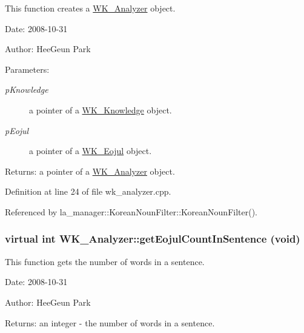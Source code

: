 This function creates a \hyperlink{classWK__Analyzer}{WK\_\-Analyzer} object. 

\begin{Desc}
\item[Date:]2008-10-31 \end{Desc}
\begin{Desc}
\item[Author:]HeeGeun Park \end{Desc}
\begin{Desc}
\item[Parameters:]
\begin{description}
\item[{\em pKnowledge}]a pointer of a \hyperlink{classWK__Knowledge}{WK\_\-Knowledge} object. \item[{\em pEojul}]a pointer of a \hyperlink{classWK__Eojul}{WK\_\-Eojul} object. \end{description}
\end{Desc}
\begin{Desc}
\item[Returns:]a pointer of a \hyperlink{classWK__Analyzer}{WK\_\-Analyzer} object. \end{Desc}


Definition at line 24 of file wk\_\-analyzer.cpp.

Referenced by la\_\-manager::KoreanNounFilter::KoreanNounFilter().\hypertarget{classWK__Analyzer_54e8115a1881d8fb0ed559b960b705c8}{
\subsubsection[{getEojulCountInSentence}]{\setlength{\rightskip}{0pt plus 5cm}virtual int WK\_\-Analyzer::getEojulCountInSentence (void)}}
\label{classWK__Analyzer_54e8115a1881d8fb0ed559b960b705c8}


This function gets the number of words in a sentence. 

\begin{Desc}
\item[Date:]2008-10-31 \end{Desc}
\begin{Desc}
\item[Author:]HeeGeun Park \end{Desc}
\begin{Desc}
\item[Returns:]an integer - the number of words in a sentence. \end{Desc}


